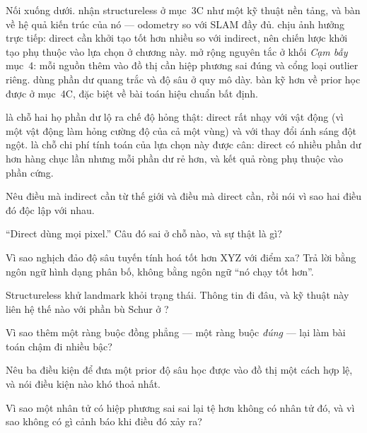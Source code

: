 \documentclass[../../vslam.tex]{subfiles}
\begin{document}
Nối xuống dưới.  nhận structureless ở mục~3C như một kỹ thuật nền tảng, và bàn về hệ quả kiến trúc của nó --- odometry so với SLAM đầy đủ.  chịu ảnh hưởng trực tiếp: direct cần khởi tạo tốt hơn nhiều so với indirect, nên chiến lược khởi tạo phụ thuộc vào lựa chọn ở chương này.  mở rộng nguyên tắc ở khối \emph{Cạm bẫy} mục~4: mỗi nguồn thêm vào đồ thị cần hiệp phương sai đúng và cổng loại outlier riêng.  dùng phần dư quang trắc và độ sâu ở quy mô dày.  bàn kỹ hơn về prior học được ở mục~4C, đặc biệt về bài toán hiệu chuẩn bất định.

 là chỗ hai họ phần dư lộ ra chế độ hỏng thật: direct rất nhạy với vật động (vì một vật động làm hỏng cường độ của cả một vùng) và với thay đổi ánh sáng đột ngột.  là chỗ chi phí tính toán của lựa chọn này được cân: direct có nhiều phần dư hơn hàng chục lần nhưng mỗi phần dư rẻ hơn, và kết quả ròng phụ thuộc vào phần cứng.

\begin{tukiem}
\item Nêu điều mà indirect cần từ thế giới và điều mà direct cần, rồi nói vì sao hai điều đó độc lập với nhau.
\item ``Direct dùng mọi pixel.'' Câu đó sai ở chỗ nào, và sự thật là gì?
\item Vì sao nghịch đảo độ sâu tuyến tính hoá tốt hơn XYZ với điểm xa? Trả lời bằng ngôn ngữ hình dạng phân bố, không bằng ngôn ngữ ``nó chạy tốt hơn''.
\item Structureless khử landmark khỏi trạng thái. Thông tin đi đâu, và kỹ thuật này liên hệ thế nào với phần bù Schur ở ?
\item Vì sao thêm một ràng buộc đồng phẳng --- một ràng buộc \emph{đúng} --- lại làm bài toán chậm đi nhiều bậc?
\item Nêu ba điều kiện để đưa một prior độ sâu học được vào đồ thị một cách hợp lệ, và nói điều kiện nào khó thoả nhất.
\item Vì sao một nhân tử có hiệp phương sai sai lại tệ hơn không có nhân tử đó, và vì sao không có gì cảnh báo khi điều đó xảy ra?
\end{tukiem}
\ifSubfilesClassLoaded{\printbibliography[title={Nguồn}]}{}
\end{document}
